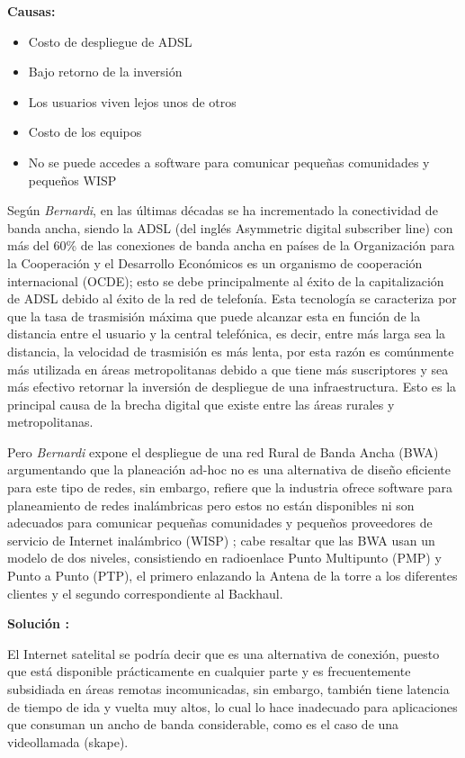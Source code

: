\documentclass[]{article}
\providecommand{\tightlist}{%
  \setlength{\itemsep}{0pt}\setlength{\parskip}{0pt}}
\begin{document}
\textbf{Causas:}

\begin{itemize}
\tightlist
\item
  Costo de despliegue de ADSL
\item
  Bajo retorno de la inversión
\item
  Los usuarios viven lejos unos de otros
\item
  Costo de los equipos
\item
  No se puede accedes a software para comunicar pequeñas comunidades y
  pequeños WISP
\end{itemize}

Según \emph{Bernardi}, en las últimas décadas se ha incrementado la
conectividad de banda ancha, siendo la ADSL (del inglés Asymmetric
digital subscriber line) con más del 60\% de las conexiones de banda
ancha en países de la Organización para la Cooperación y el Desarrollo
Económicos es un organismo de cooperación internacional (OCDE); esto se
debe principalmente al éxito de la capitalización de ADSL debido al
éxito de la red de telefonía. Esta tecnología se caracteriza por que la
tasa de trasmisión máxima que puede alcanzar esta en función de la
distancia entre el usuario y la central telefónica, es decir, entre más
larga sea la distancia, la velocidad de trasmisión es más lenta, por
esta razón es comúnmente más utilizada en áreas metropolitanas debido a
que tiene más suscriptores y sea más efectivo retornar la inversión de
despliegue de una infraestructura. Esto es la principal causa de la
brecha digital que existe entre las áreas rurales y metropolitanas.

Pero \emph{Bernardi} expone el despliegue de una red Rural de Banda
Ancha (BWA) argumentando que la planeación ad-hoc no es una alternativa
de diseño eficiente para este tipo de redes, sin embargo, refiere que la
industria ofrece software para planeamiento de redes inalámbricas pero
estos no están disponibles ni son adecuados para comunicar pequeñas
comunidades y pequeños proveedores de servicio de Internet inalámbrico
(WISP) ; cabe resaltar que las BWA usan un modelo de dos niveles,
consistiendo en radioenlace Punto Multipunto (PMP) y Punto a Punto
(PTP), el primero enlazando la Antena de la torre a los diferentes
clientes y el segundo correspondiente al Backhaul.

\textbf{Solución :}

El Internet satelital se podría decir que es una alternativa de
conexión, puesto que está disponible prácticamente en cualquier parte y
es frecuentemente subsidiada en áreas remotas incomunicadas, sin
embargo, también tiene latencia de tiempo de ida y vuelta muy altos, lo
cual lo hace inadecuado para aplicaciones que consuman un ancho de banda
considerable, como es el caso de una videollamada (skape).
\end{document}
